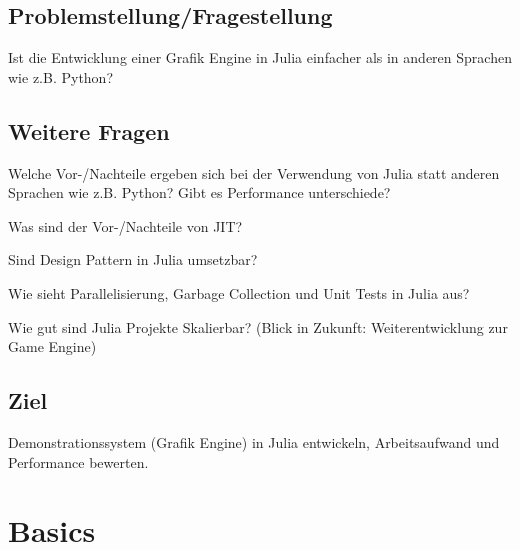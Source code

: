 \documentclass[11pt]{article}
\begin{document}
\subsection*{Problemstellung/Fragestellung}
Ist die Entwicklung einer Grafik Engine in Julia einfacher als in anderen Sprachen wie z.B. Python?

\subsection*{Weitere Fragen}
\begin{flushleft}
\begin{compactitem}
\item Welche Vor-/Nachteile ergeben sich bei der Verwendung von Julia statt anderen Sprachen wie z.B. Python? Gibt es Performance unterschiede? 
\item Was sind der Vor-/Nachteile von JIT?
\item Sind Design Pattern in Julia umsetzbar?
\item Wie sieht Parallelisierung, Garbage Collection und Unit Tests in Julia aus?
\item Wie gut sind Julia Projekte Skalierbar? (Blick in Zukunft: Weiterentwicklung zur Game Engine)
\end{compactitem}
\end{flushleft}

\subsection*{Ziel}
Demonstrationssystem (Grafik Engine) in Julia entwickeln, Arbeitsaufwand und Performance bewerten.

\newpage

\section{Basics}
\end{document}
